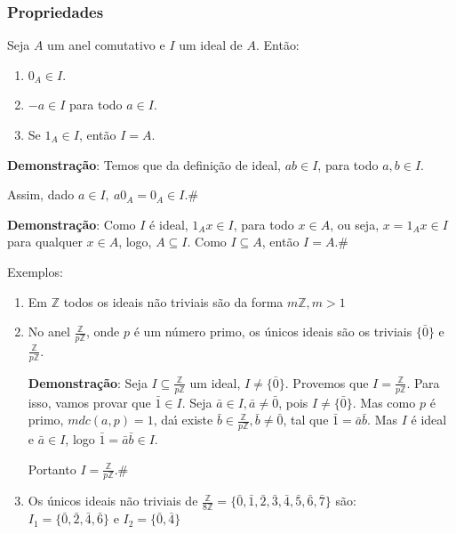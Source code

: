 \subsubsection{Propriedades}
\begin{proposicao} Seja $A$ um anel comutativo e $I$ um ideal de $A$. Ent{\~a}o:
\begin{enumerate}
 	\item $0_{A}\in I$.
 	\item $-a \in I$ para todo $a \in I$.
 	\item Se $1_A \in I$, ent\~ao $I = A$.
 \end{enumerate}
\end{proposicao}

\textbf{Demonstra{\c c}{\~a}o}: Temos que da defini{\c c}{\~a}o de ideal, $ab\in I$, para todo $a,b\in I$.

Assim, dado $a\in I,\ a0_{A}=0_{A}\in I$.\#

\textbf{Demonstra{\c c}{\~a}o}: Como $I$ {\'e} ideal, $1_{A}x\in I$, para todo $x\in A$, ou seja, $x=1_{A}x\in I$ para qualquer $x\in A$, logo, $A\subseteq I$. Como $I\subseteq A$, ent{\~a}o $I=A$.\#


Exemplos:
\begin{enumerate}
\item Em $\mathbb{Z}$ todos os ideais n{\~a}o triviais s{\~a}o da forma $m\mathbb{Z},m>1$
\item No anel $\displaystyle\frac{\mathbb{Z}}{p\mathbb{Z}}$, onde $p$ {\'e} um n{\'u}mero primo, os {\'u}nicos ideais  s{\~a}o os triviais $\{\bar{0}\}$ e $\displaystyle\frac{\mathbb{Z}}{p\mathbb{Z}}$.

\textbf{Demonstra{\c c}{\~a}o}: Seja $I\subseteq\displaystyle\frac{\mathbb{Z}}{p\mathbb{Z}}$ um ideal, $I\neq\{\bar{0}\}$. Provemos que 
$I=\displaystyle\frac{\mathbb{Z}}{p\mathbb{Z}}$. Para isso, vamos provar que $\bar{1}\in I$. Seja $\bar{a}\in I, \bar{a}\neq \bar{0}$, pois $I\neq\{\bar{0}\}$. Mas como $p$ {\'e} primo, $mdc(a,p)=1$, da{\'\i} existe $\bar{b}\in\displaystyle\frac{\mathbb{Z}}{p\mathbb{Z}},\bar{b}\neq\bar{0}$, tal que $\bar{1}=\bar{a}\bar{b}$. Mas $I$ {\'e} ideal e $\bar{a}\in I$, logo $\bar{1}=\bar{a}\bar{b}\in I$.

Portanto $I=\displaystyle\frac{\mathbb{Z}}{p\mathbb{Z}}$.\#
\item Os {\'u}nicos ideais n{\~a}o triviais de $\displaystyle\frac{\mathbb{Z}}{8\mathbb{Z}}=\{\bar{0},\bar{1},\bar{2},\bar{3},\bar{4},\bar{5},\bar{6},\bar{7}\}$ s{\~a}o:\\
$I_{1}=\{\bar{0},\bar{2},\bar{4},\bar{6}\}$ e $I_{2}=\{\bar{0},\bar{4}\}$ 

\end{enumerate}

